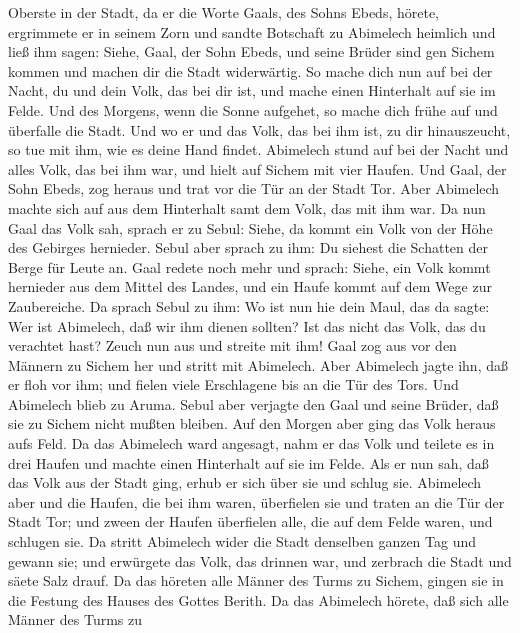 Oberste in der Stadt, da er die Worte Gaals, des Sohns Ebeds, hörete,
ergrimmete er in seinem Zorn  und sandte Botschaft zu
Abimelech heimlich und ließ ihm sagen: Siehe, Gaal, der Sohn Ebeds, und
seine Brüder sind gen Sichem kommen und machen dir die Stadt
widerwärtig.  So mache dich nun auf bei der Nacht, du und
dein Volk, das bei dir ist, und mache einen Hinterhalt auf sie im Felde.
 Und des Morgens, wenn die Sonne aufgehet, so mache dich
frühe auf und überfalle die Stadt. Und wo er und das Volk, das bei ihm
ist, zu dir hinauszeucht, so tue mit ihm, wie es deine Hand findet.
 Abimelech stund auf bei der Nacht und alles Volk, das bei
ihm war, und hielt auf Sichem mit vier Haufen.  Und Gaal,
der Sohn Ebeds, zog heraus und trat vor die Tür an der Stadt Tor. Aber
Abimelech machte sich auf aus dem Hinterhalt samt dem Volk, das mit ihm
war.  Da nun Gaal das Volk sah, sprach er zu Sebul: Siehe,
da kommt ein Volk von der Höhe des Gebirges hernieder. Sebul aber sprach
zu ihm: Du siehest die Schatten der Berge für Leute an. 
Gaal redete noch mehr und sprach: Siehe, ein Volk kommt hernieder aus
dem Mittel des Landes, und ein Haufe kommt auf dem Wege zur Zaubereiche.
 Da sprach Sebul zu ihm: Wo ist nun hie dein Maul, das da
sagte: Wer ist Abimelech, daß wir ihm dienen sollten? Ist das nicht das
Volk, das du verachtet hast? Zeuch nun aus und streite mit ihm!
 Gaal zog aus vor den Männern zu Sichem her und stritt mit
Abimelech.  Aber Abimelech jagte ihn, daß er floh vor ihm;
und fielen viele Erschlagene bis an die Tür des Tors.  Und
Abimelech blieb zu Aruma. Sebul aber verjagte den Gaal und seine Brüder,
daß sie zu Sichem nicht mußten bleiben.  Auf den Morgen
aber ging das Volk heraus aufs Feld. Da das Abimelech ward angesagt,
 nahm er das Volk und teilete es in drei Haufen und machte
einen Hinterhalt auf sie im Felde. Als er nun sah, daß das Volk aus der
Stadt ging, erhub er sich über sie und schlug sie. 
Abimelech aber und die Haufen, die bei ihm waren, überfielen sie und
traten an die Tür der Stadt Tor; und zween der Haufen überfielen alle,
die auf dem Felde waren, und schlugen sie.  Da stritt
Abimelech wider die Stadt denselben ganzen Tag und gewann sie; und
erwürgete das Volk, das drinnen war, und zerbrach die Stadt und säete
Salz drauf.  Da das höreten alle Männer des Turms zu
Sichem, gingen sie in die Festung des Hauses des Gottes Berith.
 Da das Abimelech hörete, daß sich alle Männer des Turms zu
